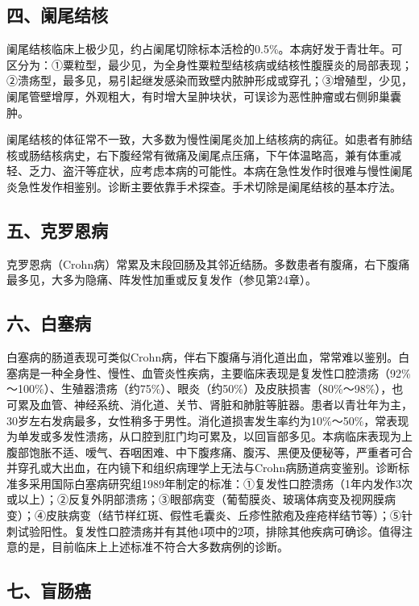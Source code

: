 \subsection{四、阑尾结核}

阑尾结核临床上极少见，约占阑尾切除标本活检的0.5\%。本病好发于青壮年。可区分为：①粟粒型，最少见，为全身性粟粒型结核病或结核性腹膜炎的局部表现；②溃疡型，最多见，易引起继发感染而致壁内脓肿形成或穿孔；③增殖型，少见，阑尾管壁增厚，外观粗大，有时增大呈肿块状，可误诊为恶性肿瘤或右侧卵巢囊肿。

阑尾结核的体征常不一致，大多数为慢性阑尾炎加上结核病的病征。如患者有肺结核或肠结核病史，右下腹经常有微痛及阑尾点压痛，下午体温略高，兼有体重减轻、乏力、盗汗等症状，应考虑本病的可能性。本病在急性发作时很难与慢性阑尾炎急性发作相鉴别。诊断主要依靠手术探查。手术切除是阑尾结核的基本疗法。

\subsection{五、克罗恩病}

克罗恩病（Crohn病）常累及末段回肠及其邻近结肠。多数患者有腹痛，右下腹痛最多见，大多为隐痛、阵发性加重或反复发作（参见第24章）。

\subsection{六、白塞病}

白塞病的肠道表现可类似Crohn病，伴右下腹痛与消化道出血，常常难以鉴别。白塞病是一种全身性、慢性、血管炎性疾病，主要临床表现是复发性口腔溃疡（92\%～100\%）、生殖器溃疡（约75\%）、眼炎（约50\%）及皮肤损害（80\%～98\%），也可累及血管、神经系统、消化道、关节、肾脏和肺脏等脏器。患者以青壮年为主，30岁左右发病最多，女性稍多于男性。消化道损害发生率约为10\%～50\%，常表现为单发或多发性溃疡，从口腔到肛门均可累及，以回盲部多见。本病临床表现为上腹部饱胀不适、嗳气、吞咽困难、中下腹疼痛、腹泻、黑便及便秘等，严重者可合并穿孔或大出血，在内镜下和组织病理学上无法与Crohn病肠道病变鉴别。诊断标准多采用国际白塞病研究组1989年制定的标准：①复发性口腔溃疡（1年内发作3次或以上）；②反复外阴部溃疡；③眼部病变（葡萄膜炎、玻璃体病变及视网膜病变）；④皮肤病变（结节样红斑、假性毛囊炎、丘疹性脓疱及痤疮样结节等）；⑤针刺试验阳性。复发性口腔溃疡并有其他4项中的2项，排除其他疾病可确诊。值得注意的是，目前临床上上述标准不符合大多数病例的诊断。

\subsection{七、盲肠癌}

